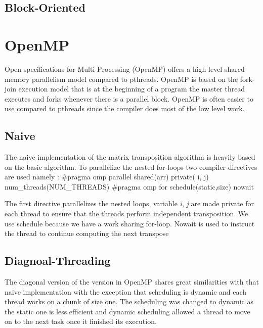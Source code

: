 \documentclass[10pt,journal]{article}
\begin{document}
\newline 

\subsection{Block-Oriented}

\section{OpenMP}

Open specifications for Multi Processing (OpenMP) offers a high level shared memory parallelism model compared to pthreads. OpenMP is based on the fork-join execution model that is at the beginning of a program the master thread executes and forks whenever there is a parallel block. OpenMP is often easier to use compared to pthreads since the compiler does most of the low level work.

\subsection{Naive}
The naive implementation of the matrix transposition algorithm is heavily based on the basic algorithm. To parallelize the nested for-loops two compiler directives are used namely :
\newline
{\#pragma omp parallel shared(arr) private( i, j) num_threads(NUM\_THREADS) } 
\newline
{\#pragma omp for schedule(static,size)  nowait}
\newline

The first directive parallelizes the nested loops, variable \textit{i}, \textit{j} are made private for each thread to ensure that the threads perform independent transposition. We use schedule because we have a work sharing for-loop. Nowait is used to instruct the thread to continue computing the next transpose

\subsection{Diagnoal-Threading}
The diagonal version of the version in OpenMP shares great similarities with that naive implementation with the exception that scheduling is dynamic and each thread works on a chunk of size one. The scheduling was changed to dynamic as the static one is less efficient and dynamic scheduling allowed a thread to move on to the next task once it finished its execution.
\end{document}
